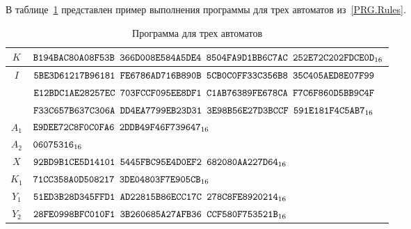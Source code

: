 \label{TEST.Prg3}

В таблице~\ref{Table.TEST.Prg3} представлен пример выполнения 
программы для трех автоматов из~\ref{PRG.Rules}.

\begin{table}[H]
\caption{Программа для трех автоматов}\label{Table.TEST.Prg3}
\begin{tabular}{|c|l|}
\hline
$K$ &
$\texttt{B194BAC80A08F53B~366D008E584A5DE4~8504FA9D1BB6C7AC~252E72C202FDCE0D}_{16}$\\
\hline
$I$ &
$\texttt{5BE3D61217B96181~FE6786AD716B890B~5CB0C0FF33C356B8~35C405AED8E07F99}$\\
&
$\texttt{E12BDC1AE28257EC~703FCCF095EE8DF1~C1AB76389FE678CA~F7C6F860D5BB9C4F}$\\
&
$\texttt{F33C657B637C306A~DD4EA7799EB23D31~3E98B56E27D3BCCF~591E181F4C5AB7}_{16}$\\
\hline
$A_1$ 
&
$\texttt{E9DEE72C8F0C0FA6~2DDB49F46F739647}_{16}$\\
\hline
$A_2$ 
&
$\texttt{06075316}_{16}$\\
\hline
$X$ 
&
$\texttt{92BD9B1CE5D14101~5445FBC95E4D0EF2~682080AA227D64}_{16}$\\
\hline
\hline
$K_1$ 
&
$\texttt{71CC358A0D508217~3DE04803F7E905CB}_{16}$\\
\hline
$Y_1$ 
&
$\texttt{51ED3B28D345FFD1~AD22815B86ECC17C~278C8FE8920214}_{16}$\\
\hline
$Y_2$ 
&
$\texttt{28FE0998BFC010F1~3B260685A27AFB36~CCF580F753521B}_{16}$\\
\hline
\end{tabular}
\end{table}
